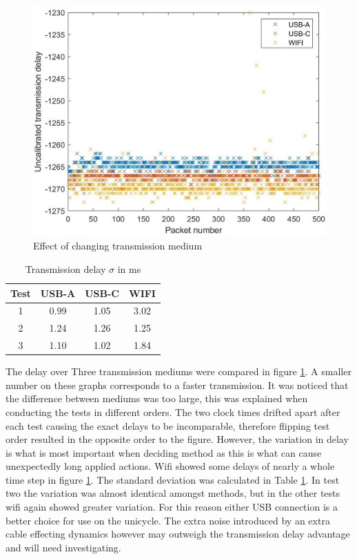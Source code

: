\documentclass[twoside,twocolumn,12pt]{article}
\begin{document}
\begin{figure}
  \centering
    \includegraphics[width=\linewidth]{all3}
  \caption{Effect of changing transmission medium}
  \label{fig:med}
\end{figure}

\begin{table}[h]
\centering
\begin{tabular}{ c | c | c | c }
Test& USB-A & USB-C & WIFI\\ 
\midrule
1&0.99&1.05 &3.02\\
2&1.24& 1.26&1.25\\
3&1.10&1.02 &1.84\\
\end{tabular}
\caption{Transmission delay $\sigma$ in ms}
\label{table:td}
\end{table}
The delay over Three transmission mediums were compared in figure \ref{fig:med}. A smaller number on these graphs corresponds to a faster transmission. It was noticed that the difference between mediums was too large, this was explained when conducting the tests in different orders. The two clock times drifted apart after each test causing the exact delays to be incomparable, therefore flipping test order resulted in the opposite order to the figure. However, the variation in delay is what is most important when deciding method as this is what can cause unexpectedly long applied actions. Wifi showed some delays of nearly a whole time step in figure \ref{fig:med}. The standard deviation was calculated in Table \ref{table:td}. In test two the variation was almost identical amongst methods, but in the other tests wifi again showed greater variation. For this reason either USB connection is a better choice for use on the unicycle. The extra noise introduced by an extra cable effecting dynamics however may outweigh the transmission delay advantage and will need investigating. 
\end{document}
